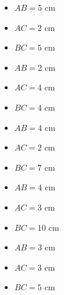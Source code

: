 \begin{multicols}{4}
\begin{itemize}
\item $AB=5$ cm
\item $AC=2$ cm
\item $BC=5$ cm
\end{itemize}

\begin{itemize}
\item $AB=2$ cm
\item $AC=4$ cm
\item $BC=4$ cm
\end{itemize}

\begin{itemize}
\item $AB=4$ cm
\item $AC=2$ cm
\item $BC=7$ cm
\end{itemize}

\begin{itemize}
\item $AB=4$ cm
\item $AC=3$ cm
\item $BC=10$ cm
\end{itemize}

\begin{itemize}
\item $AB=3$ cm
\item $AC=3$ cm
\item $BC=5$ cm
\end{itemize}

\end{multicols}